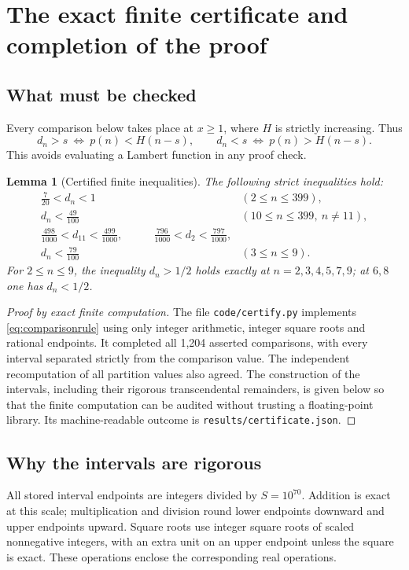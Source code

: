 \documentclass[11pt]{article}
\numberwithin{equation}{section}
\newtheorem{lemma}[theorem]{Lemma}
\theoremstyle{definition}
\theoremstyle{remark}
\begin{document}
\section{The exact finite certificate and completion of the proof}\label{sec:finite}
\subsection{What must be checked}
Every comparison below takes place at $x\ge1$, where $H$ is strictly
increasing. Thus
\begin{equation}\label{eq:comparisonrule}
 d_n>s\ \Longleftrightarrow\ p(n)<H(n-s),\qquad
 d_n<s\ \Longleftrightarrow\ p(n)>H(n-s).
\end{equation}
This avoids evaluating a Lambert function in any proof check.

\begin{lemma}[Certified finite inequalities]\label{lem:finite}
The following strict inequalities hold:
\begin{align}
 \frac7{20}<d_n<1&& (2\le n\le399),\label{eq:finiteall}\\
 d_n<\frac{49}{100}&& (10\le n\le399,\ n\ne11),\label{eq:finite49}\\
 \frac{498}{1000}<d_{11}<\frac{499}{1000},\qquad
 &\frac{796}{1000}<d_2<\frac{797}{1000},\label{eq:finitespecial}\\
 d_n<\frac{79}{100}&& (3\le n\le9).\label{eq:finite79}
\end{align}
For $2\le n\le9$, the inequality $d_n>1/2$ holds exactly at
$n=2,3,4,5,7,9$; at $6,8$ one has $d_n<1/2$.
\end{lemma}
\begin{proof}[Proof by exact finite computation]
The file \texttt{code/certify.py} implements \eqref{eq:comparisonrule}
using only integer arithmetic, integer square roots and rational
endpoints. It completed all 1,204 asserted comparisons, with every
interval separated strictly from the comparison value. The independent
recomputation of all partition values also agreed. The construction of
the intervals, including their rigorous transcendental remainders, is
given below so that the finite computation can be audited without
trusting a floating-point library. Its machine-readable outcome is
\texttt{results/certificate.json}.
\end{proof}

\subsection{Why the intervals are rigorous}
All stored interval endpoints are integers divided by
$S=10^{70}$. Addition is exact at this scale; multiplication and division
round lower endpoints downward and upper endpoints upward. Square roots
use integer square roots of scaled nonnegative integers, with an extra
unit on an upper endpoint unless the square is exact. These operations
enclose the corresponding real operations.
\end{document}

